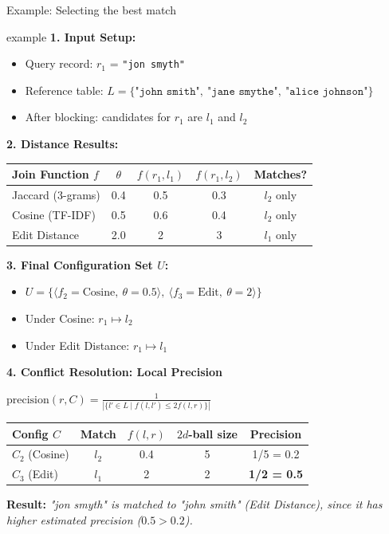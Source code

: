 \documentclass[8pt]{beamer} %
\begin{document}
\begin{frame}{Example: Selecting the best match}
	
	\begin{beamercolorbox}[rounded=true, shadow=true, leftskip=1em, rightskip=1em]{example}		
		\textbf{1. Input Setup:}
		\begin{itemize}
			\item Query record: $r_1$ = \texttt{"jon smyth"}
			\item Reference table: $L = \{\texttt{"john smith"},\ \texttt{"jane smythe"},\ \texttt{"alice johnson"}\}$
			\item After blocking: candidates for $r_1$ are $l_1$ and $l_2$
		\end{itemize}
		
		\vspace{0.5em}
		\textbf{2. Distance Results:}
		\begin{tabular}{lcccc}
			Join Function $f$ & $\theta$ & $f(r_1, l_1)$ & $f(r_1, l_2)$ & Matches? \\
			\hline
			Jaccard (3-grams) & 0.4 & 0.5 & 0.3 & $l_2$ only \\
			Cosine (TF-IDF)   & 0.5 & 0.6 & 0.4 & $l_2$ only \\
			Edit Distance     & 2.0 & 2 & 3 & $l_1$ only \\
		\end{tabular}
		
		\vspace{0.5em}
		\textbf{3. Final Configuration Set $U$:}
		\begin{itemize}
			\item $U = \{ \langle f_2 = \text{Cosine},\ \theta = 0.5 \rangle,\ \langle f_3 = \text{Edit},\ \theta = 2 \rangle \}$
			\item Under Cosine: $r_1 \mapsto l_2$
			\item Under Edit Distance: $r_1 \mapsto l_1$
		\end{itemize}
		
		\vspace{0.5em}
		\textbf{4. Conflict Resolution: Local Precision}
		
		\vspace{0.25em}
		$\text{precision}(r, C) = \frac{1}{\left| \{ l' \in L \mid f(l, l') \leq 2f(l, r) \} \right|}$
		
		\begin{tabular}{lcccc}
			Config $C$ & Match & $f(l, r)$ & $2d$-ball size & Precision \\
			\hline
			$C_2$ (Cosine) & $l_2$ & 0.4 & 5 & 1/5 = 0.2 \\
			$C_3$ (Edit)   & $l_1$ & 2 & 2 & \textbf{1/2 = 0.5} \\
		\end{tabular}
		
		\vspace{0.5em}
		\textbf{Result:} \textit{"jon smyth" is matched to "john smith" (Edit Distance), since it has higher estimated precision ($0.5 > 0.2$).}
	\end{beamercolorbox}
			
\end{frame}
\end{document}
